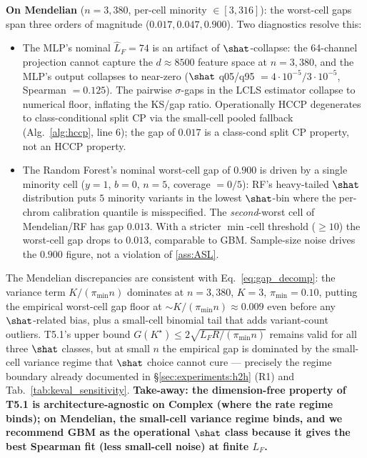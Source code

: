 \textbf{On Mendelian} ($n = 3{,}380$, per-cell minority $\in [3, 316]$): the
worst-cell gaps span three orders of magnitude ($0.017, 0.047, 0.900$). Two
diagnostics resolve this:
\begin{itemize}
\item The MLP's nominal $\hat L_F = 74$ is an artifact of $\shat$-collapse:
the 64-channel projection cannot capture the $d \approx 8500$ feature space at
$n = 3{,}380$, and the MLP's output collapses to near-zero ($\shat$ q05/q95 $=
4{\cdot}10^{-5} / 3{\cdot}10^{-5}$, Spearman $= 0.125$). The pairwise
$\sigma$-gaps in the LCLS estimator collapse to numerical floor, inflating the
KS/gap ratio. Operationally HCCP degenerates to class-conditional split CP via
the small-cell pooled fallback (Alg.~\ref{alg:hccp}, line 6); the gap of
$0.017$ is a class-cond split CP property, not an HCCP property.
\item The Random Forest's nominal worst-cell gap of $0.900$ is driven by a
single minority cell ($y = 1$, $b = 0$, $n = 5$, coverage $= 0/5$): RF's
heavy-tailed $\shat$ distribution puts $5$ minority variants in the lowest
$\shat$-bin where the per-chrom calibration quantile is misspecified. The
\emph{second}-worst cell of Mendelian/RF has gap $0.013$. With a stricter
$\min$-cell threshold ($\geq 10$) the worst-cell gap drops to $0.013$,
comparable to GBM. Sample-size noise drives the $0.900$ figure, not a
violation of \ref{ass:ASL}.
\end{itemize}

The Mendelian discrepancies are consistent with Eq.~\eqref{eq:gap_decomp}:
the variance term $K / (\pi_{\min} n)$ dominates at $n = 3{,}380$, $K = 3$,
$\pi_{\min} = 0.10$, putting the empirical worst-cell gap floor at
$\sim K / (\pi_{\min} n) \approx 0.009$ even before any $\shat$-related bias,
plus a small-cell binomial tail that adds variant-count outliers. T5.1's
upper bound $G(K^\star) \leq 2 \sqrt{L_F R / (\pi_{\min} n)}$ remains valid for
all three $\shat$ classes, but at small $n$ the empirical gap is dominated by
the small-cell variance regime that $\shat$ choice cannot cure --- precisely
the regime boundary already documented in \S\ref{sec:experiments:h2h} (R1) and
Tab.~\ref{tab:keval_sensitivity}. \textbf{Take-away: the dimension-free
property of T5.1 is architecture-agnostic on Complex (where the rate regime
binds); on Mendelian, the small-cell variance regime binds, and we recommend
GBM as the operational $\shat$ class because it gives the best Spearman fit
(less small-cell noise) at finite $L_F$.}
